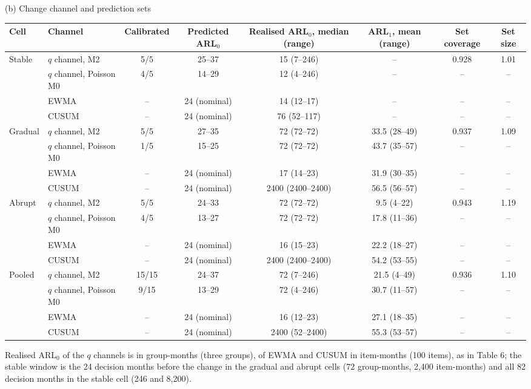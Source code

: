 {\vspace{4pt}
(b) Change channel and prediction sets

\begin{tabular}{llcccccc}
\toprule
Cell & Channel & Calibrated & Predicted ARL$_0$ & Realised ARL$_0$, median (range) & ARL$_1$, mean (range) & Set coverage & Set size \\
\midrule
Stable & $q$ channel, M2 & 5/5 & 25--37 & 15 (7--246) & -- & 0.928 & 1.01 \\
 & $q$ channel, Poisson M0 & 4/5 & 14--29 & 12 (4--246) & -- & -- & -- \\
 & EWMA & -- & 24 (nominal) & 14 (12--17) & -- & -- & -- \\
 & CUSUM & -- & 24 (nominal) & 76 (52--117) & -- & -- & -- \\
\addlinespace
Gradual & $q$ channel, M2 & 5/5 & 27--35 & 72 (72--72) & 33.5 (28--49) & 0.937 & 1.09 \\
 & $q$ channel, Poisson M0 & 1/5 & 15--25 & 72 (72--72) & 43.7 (35--57) & -- & -- \\
 & EWMA & -- & 24 (nominal) & 17 (14--23) & 31.9 (30--35) & -- & -- \\
 & CUSUM & -- & 24 (nominal) & 2400 (2400--2400) & 56.5 (56--57) & -- & -- \\
\addlinespace
Abrupt & $q$ channel, M2 & 5/5 & 24--33 & 72 (72--72) & 9.5 (4--22) & 0.943 & 1.19 \\
 & $q$ channel, Poisson M0 & 4/5 & 13--27 & 72 (72--72) & 17.8 (11--36) & -- & -- \\
 & EWMA & -- & 24 (nominal) & 16 (15--23) & 22.2 (18--27) & -- & -- \\
 & CUSUM & -- & 24 (nominal) & 2400 (2400--2400) & 54.2 (53--55) & -- & -- \\
\addlinespace
Pooled & $q$ channel, M2 & 15/15 & 24--37 & 72 (7--246) & 21.5 (4--49) & 0.936 & 1.10 \\
 & $q$ channel, Poisson M0 & 9/15 & 13--29 & 72 (4--246) & 30.7 (11--57) & -- & -- \\
 & EWMA & -- & 24 (nominal) & 16 (12--23) & 27.1 (18--35) & -- & -- \\
 & CUSUM & -- & 24 (nominal) & 2400 (52--2400) & 55.3 (53--57) & -- & -- \\
\bottomrule
\end{tabular}}

Realised ARL$_0$ of the $q$ channels is in group-months (three groups), of EWMA and CUSUM in item-months (100 items), as in Table 6; the stable window is the 24 decision months before the change in the gradual and abrupt cells (72 group-months, 2,400 item-months) and all 82 decision months in the stable cell (246 and 8,200).

